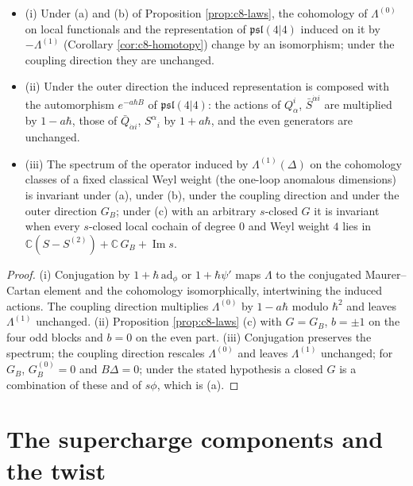 \begin{theorem}
\label{thm:c8-invariants}
\begin{itemize}
\item (i) Under (a) and (b) of Proposition \ref{prop:c8-laws}, the cohomology of $\Lambda^{(0)}$ on local functionals and the representation of $\mathfrak{psl}(4|4)$ induced on it by $-\Lambda^{(1)}$ (Corollary \ref{cor:c8-homotopy}) change by an isomorphism; under the coupling direction they are unchanged.
\item (ii) Under the outer direction the induced representation is composed with the automorphism $e^{-a\hbar B}$ of $\mathfrak{psl}(4|4)$: the actions of $Q^i_\alpha$, $\bar S^{\dot\alpha i}$ are multiplied by $1-a\hbar$, those of $\bar Q_{\dot\alpha i}$, $S^\alpha{}_i$ by $1+a\hbar$, and the even generators are unchanged.
\item (iii) The spectrum of the operator induced by $\Lambda^{(1)}(\Delta)$ on the cohomology classes of a fixed classical Weyl weight (the one-loop anomalous dimensions) is invariant under (a), under (b), under the coupling direction and under the outer direction $G_B$; under (c) with an arbitrary $s$-closed $G$ it is invariant when every $s$-closed local cochain of degree $0$ and Weyl weight $4$ lies in $\mathbb C(S-S^{(2)})+\mathbb C\,G_B+\operatorname{Im}s$.
\end{itemize}
\end{theorem}

\begin{proof}
(i) Conjugation by $1+\hbar\,\mathrm{ad}_\phi$ or $1+\hbar\psi'$ maps $\Lambda$ to the conjugated Maurer--Cartan element and the cohomology isomorphically, intertwining the induced actions. The coupling direction multiplies $\Lambda^{(0)}$ by $1-a\hbar$ modulo $\hbar^2$ and leaves $\Lambda^{(1)}$ unchanged. (ii) Proposition \ref{prop:c8-laws} (c) with $G=G_B$, $b=\pm1$ on the four odd blocks and $b=0$ on the even part. (iii) Conjugation preserves the spectrum; the coupling direction rescales $\Lambda^{(0)}$ and leaves $\Lambda^{(1)}$ unchanged; for $G_B$, $G_B^{(0)}=0$ and $B\Delta=0$; under the stated hypothesis a closed $G$ is a combination of these and of $s\phi$, which is (a).
\end{proof}

\section{The supercharge components and the twist}

